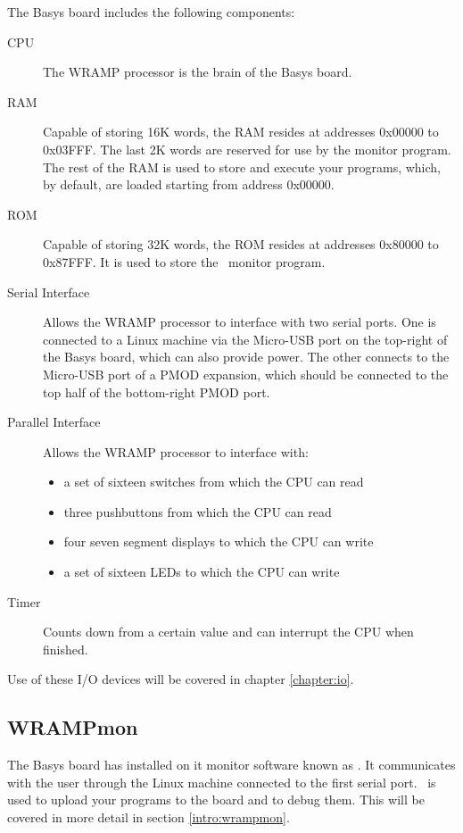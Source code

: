 The Basys board includes the following components:

\begin{description}
\item[CPU] The WRAMP processor is the brain of the Basys board.
%
\item[RAM] Capable of storing 16K words, the RAM resides at addresses 0x00000
to 0x03FFF. The last  2K words are reserved for use by the monitor program. The rest 
of the RAM is used to store and execute your programs, which, by default, are 
loaded starting from address 0x00000.
%
\item[ROM] Capable of storing 32K words, the ROM resides at addresses 
0x80000 to 0x87FFF. It is used to store the \WRAMPmon\ monitor program.
%
\item[Serial Interface] Allows the WRAMP processor to interface with two serial
ports. One is connected to a Linux machine via the Micro-USB port on the top-right
of the Basys board, which can also provide power. The other connects to the Micro-USB
port of a PMOD expansion, which should be connected to the top half of the 
bottom-right PMOD port.
%
\item[Parallel Interface] Allows the WRAMP processor to interface with: 
\begin{itemize}
\item a set of sixteen switches from which the CPU can read
\item three pushbuttons from which the CPU can read
\item four seven segment displays to which the CPU can write
\item a set of sixteen LEDs to which the CPU can write
\end{itemize}
\item[Timer] Counts down from a certain value and can interrupt the CPU when 
finished.
%
\end{description}
Use of these I/O devices will be covered in chapter \ref{chapter:io}.

\subsection{WRAMPmon}
The Basys board has installed on it monitor software known as \WRAMPmon.
It communicates with the user through the Linux machine connected to
the first serial port. \WRAMPmon\ is used to upload your programs to the
board and to debug them. This will be covered in more detail in
section \ref{intro:wrampmon}.
%
%
%
